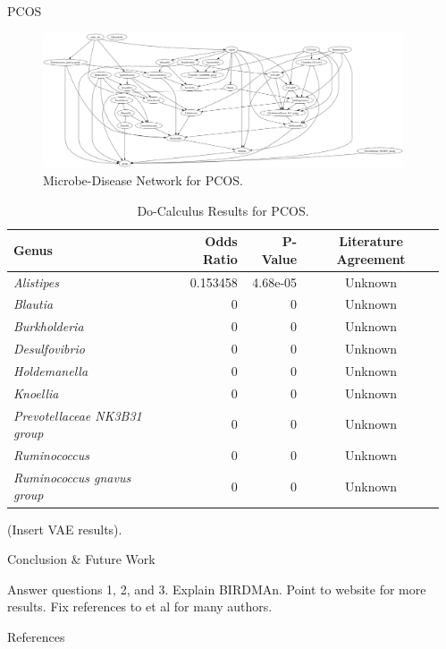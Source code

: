 \documentclass[final]{beamer}
\newlength{\sepwidth}
\newlength{\colwidth}
\newcommand{\separatorcolumn}{\begin{column}{\sepwidth}\end{column}}
\begin{document}
\begin{frame}[t]
\begin{columns}[t]
\begin{column}{\colwidth}
\begin{block}{PCOS}
    \begin{figure}
      \centering
      \includegraphics[width=\linewidth]{../graphs/pcos/cdnod.png}
      \caption{Microbe-Disease Network for PCOS.}
    \end{figure}
    
    \begin{table}
      \centering
      \begin{tabular}{l r r c}
        \toprule
        \textbf{Genus} & \textbf{Odds Ratio} & \textbf{P-Value} & \textbf{Literature Agreement} \\
        \midrule
        \textit{Alistipes} & 0.153458 & 4.68e-05 & Unknown \\
        \textit{Blautia} & 0 & 0 & Unknown \\
        \textit{Burkholderia} & 0 & 0 & Unknown \\
        \textit{Desulfovibrio} & 0 & 0 & Unknown \\
        \textit{Holdemanella} & 0 & 0 & Unknown \\
        \textit{Knoellia} & 0 & 0 & Unknown \\
        \textit{Prevotellaceae NK3B31 group} & 0 & 0 & Unknown \\
        \textit{Ruminococcus} & 0 & 0 & Unknown \\
        \textit{Ruminococcus gnavus group} & 0 & 0 & Unknown \\
        \bottomrule
      \end{tabular}
      \caption{Do-Calculus Results for PCOS.}
    \end{table}

   (Insert VAE results).

  \end{block}

  \begin{block}{Conclusion \& Future Work}

    Answer questions 1, 2, and 3. Explain BIRDMAn. Point to website for more results. Fix references to et al for many authors. 
    
  \end{block}

  \begin{block}{References}

    \footnotesize{}

  \end{block}

\end{column}

\separatorcolumn
\end{columns}
\end{frame}
\end{document}
